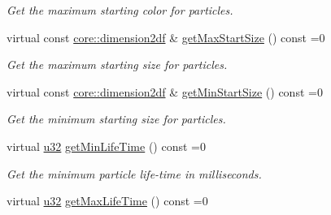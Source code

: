 \begin{DoxyCompactItemize}
\begin{DoxyCompactList}\small\item\em Get the maximum starting color for particles. \end{DoxyCompactList}\item 
\mbox{\label{classirr_1_1scene_1_1IParticleEmitter_a89a84536dc2ddc0df4ec831f9367b187}} 
virtual const \hyperlink{namespaceirr_1_1core_a54f0e5b7416e6dce5a0f6213f00a580f}{core\+::dimension2df} \& \hyperlink{classirr_1_1scene_1_1IParticleEmitter_a89a84536dc2ddc0df4ec831f9367b187}{get\+Max\+Start\+Size} () const =0
\begin{DoxyCompactList}\small\item\em Get the maximum starting size for particles. \end{DoxyCompactList}\item 
\mbox{\label{classirr_1_1scene_1_1IParticleEmitter_a97ddc124d93f83164aa49f7b6370bc8f}} 
virtual const \hyperlink{namespaceirr_1_1core_a54f0e5b7416e6dce5a0f6213f00a580f}{core\+::dimension2df} \& \hyperlink{classirr_1_1scene_1_1IParticleEmitter_a97ddc124d93f83164aa49f7b6370bc8f}{get\+Min\+Start\+Size} () const =0
\begin{DoxyCompactList}\small\item\em Get the minimum starting size for particles. \end{DoxyCompactList}\item 
\mbox{\label{classirr_1_1scene_1_1IParticleEmitter_a35c512bd4cd12411ae0b7344f7511dd0}} 
virtual \hyperlink{namespaceirr_a0416a53257075833e7002efd0a18e804}{u32} \hyperlink{classirr_1_1scene_1_1IParticleEmitter_a35c512bd4cd12411ae0b7344f7511dd0}{get\+Min\+Life\+Time} () const =0
\begin{DoxyCompactList}\small\item\em Get the minimum particle life-\/time in milliseconds. \end{DoxyCompactList}\item 
\mbox{\label{classirr_1_1scene_1_1IParticleEmitter_a8e0455166f97db683686b5deb43da83f}} 
virtual \hyperlink{namespaceirr_a0416a53257075833e7002efd0a18e804}{u32} \hyperlink{classirr_1_1scene_1_1IParticleEmitter_a8e0455166f97db683686b5deb43da83f}{get\+Max\+Life\+Time} () const =0

\end{DoxyCompactItemize}
